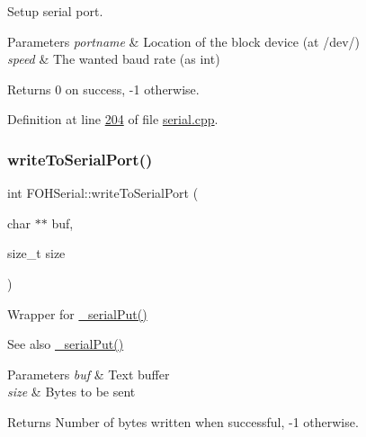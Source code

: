Setup serial port. 


\begin{DoxyParams}{Parameters}
{\em portname} & Location of the block device (at /dev/) \\
\hline
{\em speed} & The wanted baud rate (as int)\\
\hline
\end{DoxyParams}
\begin{DoxyReturn}{Returns}
0 on success, -\/1 otherwise. 
\end{DoxyReturn}


Definition at line \mbox{\hyperlink{serial_8cpp_source_l00204}{204}} of file \mbox{\hyperlink{serial_8cpp_source}{serial.\+cpp}}.

\mbox{\label{classFOHSerial_a6bb54e84682142525b9a24a122157234}} 
\subsubsection{\texorpdfstring{write\+To\+Serial\+Port()}{writeToSerialPort()}}
{\footnotesize\ttfamily int F\+O\+H\+Serial\+::write\+To\+Serial\+Port (\begin{DoxyParamCaption}\item[{char $\ast$$\ast$}]{buf,  }\item[{size\+\_\+t}]{size }\end{DoxyParamCaption})}



Wrapper for \mbox{\hyperlink{classFOHSerial_add9b2e556b56459b2eddc9b71f5c80ed}{\+\_\+serial\+Put()}} 

\begin{DoxySeeAlso}{See also}
\mbox{\hyperlink{classFOHSerial_add9b2e556b56459b2eddc9b71f5c80ed}{\+\_\+serial\+Put()}}
\end{DoxySeeAlso}

\begin{DoxyParams}{Parameters}
{\em buf} & Text buffer \\
\hline
{\em size} & Bytes to be sent\\
\hline
\end{DoxyParams}
\begin{DoxyReturn}{Returns}
Number of bytes written when successful, -\/1 otherwise.
\end{DoxyReturn}


